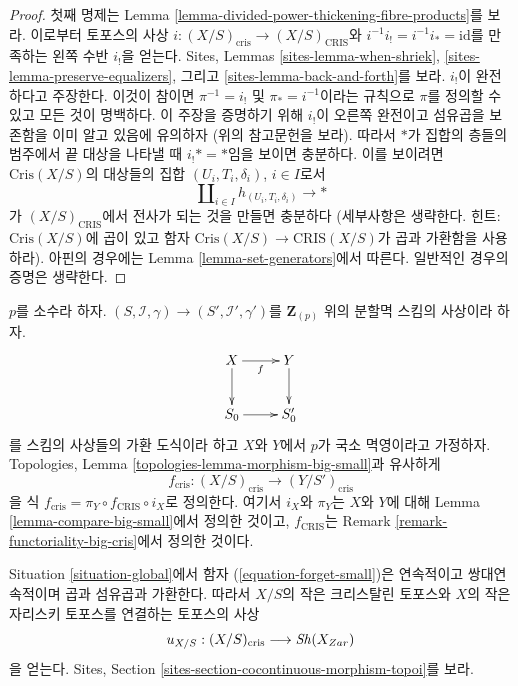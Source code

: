 \begin{proof}
첫째 명제는 Lemma \ref{lemma-divided-power-thickening-fibre-products}를
보라. 이로부터 토포스의 사상
$i : (X/S)_{\text{cris}} \to (X/S)_{\text{CRIS}}$와
$i^{-1}i_! = i^{-1}i_* = \text{id}$를 만족하는 왼쪽 수반 $i_!$을
얻는다. Sites, Lemmas \ref{sites-lemma-when-shriek},
\ref{sites-lemma-preserve-equalizers}, 그리고
\ref{sites-lemma-back-and-forth}를 보라.
$i_!$이 완전하다고 주장한다. 이것이 참이면
$\pi^{-1} = i_!$ 및 $\pi_* = i^{-1}$이라는 규칙으로 $\pi$를
정의할 수 있고 모든 것이 명백하다. 이 주장을 증명하기 위해
$i_!$이 오른쪽 완전이고 섬유곱을 보존함을 이미 알고 있음에 유의하자
(위의 참고문헌을 보라). 따라서 $*$가 집합의 층들의 범주에서
끝 대상을 나타낼 때 $i_! * = *$임을 보이면 충분하다.
이를 보이려면 $\text{Cris}(X/S)$의 대상들의 집합
$(U_i, T_i, \delta_i)$, $i \in I$로서
$$
\coprod\nolimits_{i \in I} h_{(U_i, T_i, \delta_i)} \to *
$$
가 $(X/S)_{\text{CRIS}}$에서 전사가 되는 것을 만들면 충분하다
(세부사항은 생략한다. 힌트: $\text{Cris}(X/S)$에 곱이 있고 함자
$\text{Cris}(X/S) \to \text{CRIS}(X/S)$가 곱과 가환함을 사용하라).
아핀의 경우에는 Lemma \ref{lemma-set-generators}에서 따른다.
일반적인 경우의 증명은 생략한다.
\end{proof}

\begin{remark}[함자성]
\label{remark-functoriality-cris}
$p$를 소수라 하자.
$(S, \mathcal{I}, \gamma) \to (S', \mathcal{I}', \gamma')$를
$\mathbf{Z}_{(p)}$ 위의 분할멱 스킴의 사상이라 하자.
$$
\xymatrix{
X \ar[r]_f \ar[d] & Y \ar[d] \\
S_0 \ar[r] & S'_0
}
$$
를 스킴의 사상들의 가환 도식이라 하고 $X$와 $Y$에서 $p$가
국소 멱영이라고 가정하자. Topologies,
Lemma \ref{topologies-lemma-morphism-big-small}과 유사하게
$$
f_{\text{cris}} : (X/S)_{\text{cris}} \longrightarrow (Y/S')_{\text{cris}}
$$
을 식 $f_{\text{cris}} = \pi_Y \circ f_{\text{CRIS}} \circ i_X$로
정의한다. 여기서 $i_X$와 $\pi_Y$는 $X$와 $Y$에 대해
Lemma \ref{lemma-compare-big-small}에서 정의한 것이고,
$f_{\text{CRIS}}$는 Remark \ref{remark-functoriality-big-cris}에서
정의한 것이다.
\end{remark}

\begin{remark}
\label{remark-compare-zariski}
Situation \ref{situation-global}에서 함자
(\ref{equation-forget-small})은 연속적이고 쌍대연속적이며 곱과
섬유곱과 가환한다. 따라서 $X/S$의 작은 크리스탈린 토포스와
$X$의 작은 자리스키 토포스를 연결하는 토포스의 사상
$$
u_{X/S} : (X/S)_{\text{cris}} \longrightarrow \mathop{\mathit{Sh}}\nolimits(X_{Zar})
$$
을 얻는다. Sites, Section \ref{sites-section-cocontinuous-morphism-topoi}를
보라.
\end{remark}

